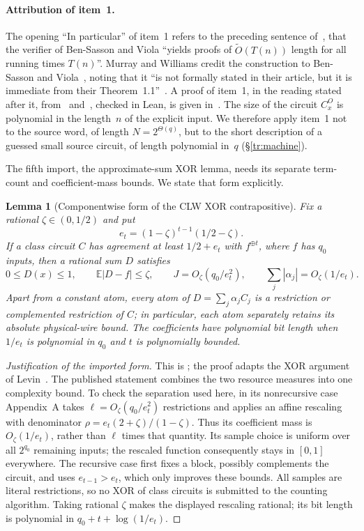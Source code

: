 \documentclass[11pt,letterpaper]{article}
\newtheorem{lemma}[theorem]{Lemma}
\theoremstyle{definition}
\theoremstyle{remark}
\begin{document}
\paragraph{Attribution of item~1.}
The opening ``In particular'' of item~1 refers to the preceding sentence
of~\cite{MW20}, that the verifier of Ben-Sasson and Viola ``yields proofs
of $\tilde O(T(n))$ length for all running times $T(n)$''. Murray and
Williams credit the construction to Ben-Sasson and
Viola~\cite{BenSassonViola}, noting that it ``is not formally stated in
their article, but it is immediate from their
Theorem~1.1''~\cite[footnote~5]{MW20}. A proof of item~1, in the
reading stated after it, from~\cite[Theorem~11.1]{BCGT13}
and~\cite[Corollary~3.2]{Sho88}, checked in Lean, is given
in~\cite{NagQuartic}. The size of the circuit $C^O_x$ is polynomial in
the length~$n$ of the explicit input. We therefore apply item~1 not to
the source word, of length $N=2^{\Theta(q)}$, but to the short
description of a guessed small source circuit, of length polynomial
in~$q$ (\S\ref{tr:machine}).

The fifth import, the approximate-sum XOR lemma, needs its separate
term-count and coefficient-mass bounds. We state that form explicitly.

\begin{lemma}[Componentwise form of the CLW XOR contrapositive]
\label{tr:xor}
Fix a rational $\zeta\in(0,1/2)$ and put
\[
 e_t=(1-\zeta)^{t-1}(1/2-\zeta).
\]
If a class circuit $C$ has agreement at least $1/2+e_t$ with
$f^{\oplus t}$, where $f$ has $q_0$ inputs, then a rational sum $D$
satisfies
\[
 0\le D(x)\le1,\qquad \mathbb E|D-f|\le\zeta,
 \qquad J=O_\zeta(q_0/e_t^2),\qquad
 \sum_j|\alpha_j|=O_\zeta(1/e_t).
\]
Apart from a constant atom, every atom of $D=\sum_j\alpha_j C_j$
is a restriction or complemented restriction of $C$; in particular,
each atom separately retains its absolute physical-wire bound.
The coefficients have polynomial bit length when $1/e_t$ is polynomial
in $q_0$ and $t$ is polynomially bounded.
\end{lemma}

\begin{proof}[Justification of the imported form]
This is \cite[Lemma~3.8 and Appendix~A]{CLW}; the proof adapts the
XOR argument of Levin~\cite{Levin}. The published statement combines
the two resource measures into one complexity bound. To check the
separation used here, in its nonrecursive case Appendix~A takes
$\ell=O_\zeta(q_0/e_t^2)$ restrictions and applies an affine
rescaling with denominator
$\rho=e_t(2+\zeta)/(1-\zeta)$. Thus its coefficient mass is
$O_\zeta(1/e_t)$, rather than $\ell$ times that quantity.
Its sample choice is uniform over all $2^{q_0}$ remaining inputs;
the rescaled function consequently stays in $[0,1]$ everywhere.
The recursive case first fixes a block, possibly complements the
circuit, and uses $e_{t-1}>e_t$, which only improves these bounds.
All samples are literal restrictions, so no XOR of class circuits
is submitted to the counting algorithm. Taking rational $\zeta$
makes the displayed rescaling rational; its bit length is polynomial
in $q_0+t+\log(1/e_t)$.
\end{proof}
\end{document}
